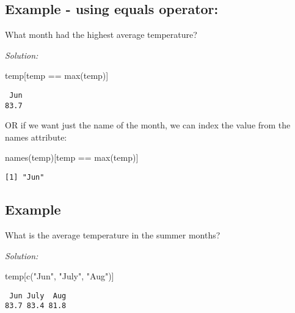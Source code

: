 \documentclass[
  letterpaper,
  DIV=11,
  numbers=noendperiod]{scrreprt}
\newenvironment{Shaded}{\begin{snugshade}}{\end{snugshade}}
\newcommand{\FunctionTok}[1]{\textcolor[rgb]{0.28,0.35,0.67}{#1}}
\newcommand{\NormalTok}[1]{\textcolor[rgb]{0.00,0.23,0.31}{#1}}
\newcommand{\SpecialCharTok}[1]{\textcolor[rgb]{0.37,0.37,0.37}{#1}}
\newcommand{\StringTok}[1]{\textcolor[rgb]{0.13,0.47,0.30}{#1}}
\begin{document}
\subsection*{Example - using equals
operator:}\label{example---using-equals-operator}

What month had the highest average temperature?

\emph{Solution:}

\begin{Shaded}
\begin{Highlighting}[]
\NormalTok{temp[temp }\SpecialCharTok{==} \FunctionTok{max}\NormalTok{(temp)]}
\end{Highlighting}
\end{Shaded}

\begin{verbatim}
 Jun 
83.7 
\end{verbatim}

OR if we want just the name of the month, we can index the value from
the names attribute:

\begin{Shaded}
\begin{Highlighting}[]
\FunctionTok{names}\NormalTok{(temp)[temp }\SpecialCharTok{==} \FunctionTok{max}\NormalTok{(temp)]}
\end{Highlighting}
\end{Shaded}

\begin{verbatim}
[1] "Jun"
\end{verbatim}

\subsection*{Example}\label{example-2}

What is the average temperature in the summer months?

\emph{Solution:}

\begin{Shaded}
\begin{Highlighting}[]
\NormalTok{temp[}\FunctionTok{c}\NormalTok{(}\StringTok{"Jun"}\NormalTok{, }\StringTok{"July"}\NormalTok{, }\StringTok{"Aug"}\NormalTok{)]}
\end{Highlighting}
\end{Shaded}

\begin{verbatim}
 Jun July  Aug 
83.7 83.4 81.8 
\end{verbatim}
\end{document}
